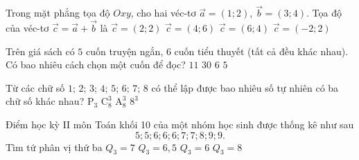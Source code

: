 \begin{ex}%
	Trong mặt phẳng tọa độ $Oxy$, cho hai véc-tơ $\overrightarrow{a}=(1;2)$, $\overrightarrow{b}=(3;4)$. Tọa độ của véc-tơ $\overrightarrow{c}=\overrightarrow{a}+\overrightarrow{b}$ là
	\choice
	{$\overrightarrow{c}=(2;2)$}
	{\True $\overrightarrow{c}=(4;6)$}
	{$\overrightarrow{c}=(6;4)$}
	{$\overrightarrow{c}=(-2;2)$}
\end{ex}
\begin{ex}%
	Trên giá sách có $5$ cuốn truyện ngắn, $6$ cuốn tiểu thuyết (tất cả đều khác nhau). Có bao nhiêu cách chọn một cuốn để đọc?
	\choice
	{\True $11$}
	{$30$}
	{$6$}
	{$5$}
\end{ex}
\begin{ex}%
	Từ các chữ số $1$; $2$; $3$; $4$; $5$; $6$; $7$; $8$ có thể lập được bao nhiêu số tự nhiên có ba chữ số khác nhau?
	\choice
	{$\mathrm{P}_3$}
	{$\mathrm{C}_8^3$}
	{\True $\mathrm{A}_8^3$}
	{$8^3$}
\end{ex}
\begin{ex}%
	Điểm học kỳ II môn Toán khối 10 của một nhóm học sinh được thống kê như sau 
	\[5;5;6;6;6;7;7;8;9;9.\]
	Tìm tứ phân vị thứ ba
	\choice
	{$Q_3=7$}
	{$Q_3=6{,}5$}
	{$Q_3=6$}
	{\True $Q_3=8$}
\end{ex}
